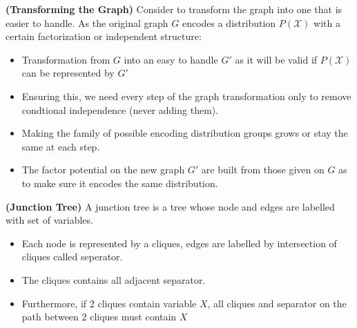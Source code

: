 \begin{remark}{\textbf{(Transforming the Graph)}}
    Consider to transform the graph into one that is easier to handle. As the original graph $G$ encodes a distribution $P(\mathcal{X})$ with a certain factorization or independent structure:
    \begin{itemize}
        \item Transformation from $G$ into an easy to handle $G'$ as it will be valid if $P(\mathcal{X})$ can be represented by $G'$
        \item Ensuring this, we need every step of the graph transformation only to remove condtional independence (never adding them).
        \item Making the family of possible encoding distribution groups grows or stay the same at each step. 
        \item The factor potential on the new graph $G'$ are built from those given on $G$ as to make sure it encodes the same distribution.  
    \end{itemize}    
\end{remark}

\begin{definition}{\textbf{(Junction Tree)}}
    A junction tree is a tree whose node and edges are labelled with set of variables. 
    \begin{itemize}
        \item Each node is represented by a cliques, edges are labelled by intersection of cliques called seperator. 
        \item The cliques contains all adjacent separator. 
        \item Furthermore, if $2$ cliques contain variable $X$, all cliques and separator on the path between $2$ cliques must contain $X$
    \end{itemize}
\end{definition}

